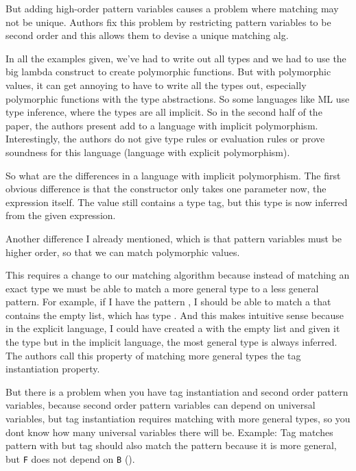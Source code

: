 \documentclass[12pt]{article}	%
\begin{document}
But adding high-order pattern variables causes a problem where matching may not be unique. Authors fix this problem by restricting pattern variables to be second order and this allows them to devise a unique matching alg.

In all the examples given, we've had to write out all types and we had to use the big lambda construct to create polymorphic functions. But with polymorphic values, it can get annoying to have to write all the types out, especially polymorphic functions with the type abstractions. So some languages like ML use type inference, where the types are all implicit. So in the second half of the paper, the authors present add \Dynamic to a language with implicit polymorphism. Interestingly, the authors do not give type rules or evaluation rules or prove soundness for this language (language with explicit polymorphism).

So what are the differences in a language with implicit polymorphism. The first obvious difference is that the constructor only takes one parameter now, the expression itself. The \Dynamic value still contains a type tag, but this type is now inferred from the given expression.

Another difference I already mentioned, which is that pattern variables must be higher order, so that we can match polymorphic values.

This requires a change to our matching algorithm because instead of matching an exact type we must be able to match a more general type to a less general pattern. For example, if I have the pattern , I should be able to match a \Dynamic that contains the empty list, which has type . And this makes intuitive sense because in the explicit language, I could have created a \Dynamic with the empty list and given it the type  but in the implicit language, the most general type is always inferred. The authors call this property of matching more general types the tag instantiation property.

But there is a problem when you have tag instantiation and second order pattern variables, because second order pattern variables can depend on universal variables, but tag instantiation requires matching with more general types, so you dont know how many universal variables there will be. 
	Example:
	Tag  matches pattern  with  but tag  should also match the pattern because it is more general, but \texttt{F} does not depend on \texttt{B} ().
	
\end{document}

